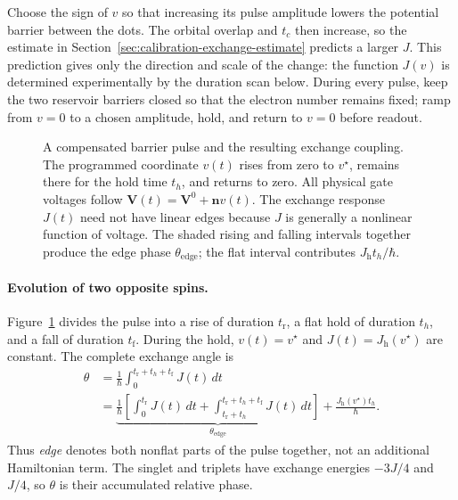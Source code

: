 Choose the sign of $v$ so that increasing its pulse amplitude lowers
the potential barrier between the dots. The orbital overlap and
$t_c$ then increase, so the estimate in
Section~\ref{sec:calibration-exchange-estimate} predicts a larger
$J$. This prediction gives only the direction and scale of the
change: the function $J(v)$ is determined experimentally by the
duration scan below. During every pulse, keep the two reservoir
barriers closed so that the electron number remains fixed; ramp from
$v=0$ to a chosen amplitude, hold, and return to $v=0$ before readout.

\begin{figure}[htbp]
 \centering
 
 \caption{A compensated barrier pulse and the resulting exchange
 coupling. The programmed coordinate $v(t)$ rises from zero to
 $v^\star$, remains there for the hold time $t_h$, and returns to
 zero. All physical gate voltages follow
 $\mathbf V(t)=\mathbf V^0+\mathbf n v(t)$. The exchange response
 $J(t)$ need not have linear edges because $J$ is generally a
 nonlinear function of voltage. The shaded rising and falling
 intervals together produce the edge phase
 $\theta_{\mathrm{edge}}$; the flat interval contributes
 $J_{\mathrm h}t_h/\hbar$.}
 \label{fig:calibration-exchange-pulse-shape}
\end{figure}

\paragraph{Evolution of two opposite spins.}
Figure~\ref{fig:calibration-exchange-pulse-shape} divides the pulse
into a rise of duration $t_{\mathrm r}$, a flat hold of duration
$t_h$, and a fall of duration $t_{\mathrm f}$. During the hold,
$v(t)=v^\star$ and $J(t)=J_{\mathrm h}(v^\star)$ are constant.
The complete exchange angle is
\begin{equation}
 \begin{aligned}
 \theta
 &=\frac1\hbar
   \int_0^{t_{\mathrm r}+t_h+t_{\mathrm f}}J(t)\,dt\\
 &=\underbrace{\frac1\hbar
   \left[
    \int_0^{t_{\mathrm r}}J(t)\,dt+
    \int_{t_{\mathrm r}+t_h}^{t_{\mathrm r}+t_h+t_{\mathrm f}}
            J(t)\,dt
   \right]}_{\displaystyle\theta_{\mathrm{edge}}}
   +\frac{J_{\mathrm h}(v^\star)t_h}{\hbar}.
 \end{aligned}
 \label{eq:calibration-exchange-pulse-area}
\end{equation}
Thus \emph{edge} denotes both nonflat parts of the pulse together,
not an additional Hamiltonian term. The singlet and triplets have
exchange energies $-3J/4$ and $J/4$, so $\theta$ is their accumulated
relative phase.

